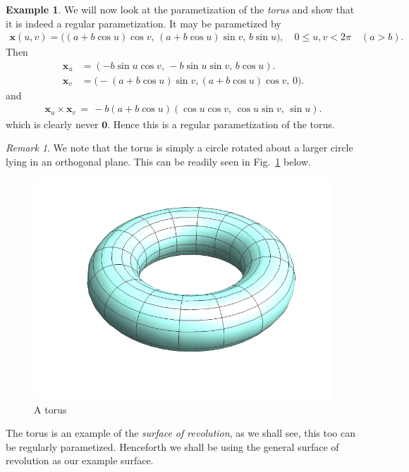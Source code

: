 \documentclass{UKZNcomp}
\newcommand{\vect}[1]{\mathbf{#1}} %
\theoremstyle{definition}
\newtheorem{example}[definition]{Example}
\theoremstyle{remark}
\newtheorem*{remark}{Remark}
\begin{document}
\begin{example}\label{ex:232}
We will now look at the parametization of the \textit{torus} and show that it is indeed a regular parametization. It may be parametized by
\begin{align*}
\vect{x}(u,v) = \big((a + b\cos u)\cos v, \,(a + b\cos u)\sin v,\, b\sin u\big), \quad 0 \leq u, v < 2\pi \quad (a>b).
\end{align*}
Then
\begin{align*}
\vect x_u &= (-b\sin u \cos v, \, -b\sin u \sin v, \,b\cos u). \\
\vect x_v &= \big(-(a + b\cos u)\sin v, (a + b\cos u)\cos v,\,0\big).
\end{align*} 
and
\begin{align*}
\vect x_u\times \vect x_v \, = \, -b(a + b\cos u)(\cos u\cos v, \, \cos u\sin v, \, \sin u).
\end{align*}
which is clearly never $\vect{0}$. Hence this is a regular parametization of the torus.
\end{example}

\begin{remark}
We note that the torus is simply a circle rotated about a larger circle lying in an orthogonal plane. This can be readily seen in Fig.~\ref{fig:mytorus} below.
\begin{figure}[H]
    \centerline{\includegraphics[scale=1]{mytorus}}
    \caption[Parametization of a torus ]{\label{fig:mytorus}
    A torus}
\end{figure}
\end{remark}

The torus is an example of the \textit{surface of revolution}, as we shall see, this too can be regularly parametized. Henceforth we shall be using the general surface of revolution as our example surface.
\end{document}
